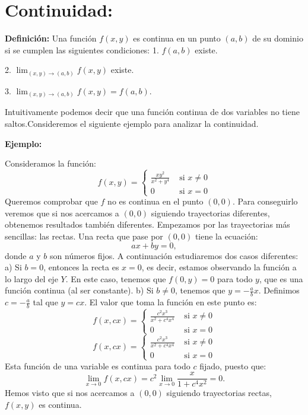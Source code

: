 \section{Continuidad:}
\textbf{Definición:} Una función $f(x, y)$ es continua en un punto $(a, b)$ de su dominio si se cumplen las siguientes condiciones:
1. $f(a, b)$ existe.\par
2. $\lim _{(x, y) \rightarrow(a, b)} f(x, y)$ existe.\par
3. $\lim _{(x, y) \rightarrow(a, b)} f(x, y)=f(a, b)$.\par
\par
Intuitivamente podemos decir que una función continua de dos variables no tiene saltos.Consideremos el siguiente ejemplo para analizar la continuidad.\par
\textbf{Ejemplo:}\par
Consideramos la función:
$$
    f(x, y)= \begin{cases}\frac{x y^{2}}{x^{2}+y^{4}} & \text { si } x \neq 0 \\ 0 & \text { si } x=0\end{cases}
$$
Queremos comprobar que $f$ no es continua en el punto $(0,0)$. Para conseguirlo veremos que si nos acercamos a $(0,0)$ siguiendo trayectorias diferentes, obtenemos resultados también diferentes. Empezamos por las trayectorias más sencillas: las rectas. Una recta que pase por $(0,0)$ tiene la ecuación:
$$
    a x+b y=0,
$$
donde $a$ y $b$ son números fijos. A continuación estudiaremos dos casos diferentes:
a) Si $b=0$, entonces la recta es $x=0$, es decir, estamos observando la función a lo largo del eje $Y$. En este caso, tenemos que $f(0, y)=0$ para todo $y$, que es una función continua (al ser constante).
b) Si $b \neq 0$, tenemos que $y=-\frac{a}{b} x$. Definimos $c=-\frac{a}{b}$ tal que $y=c x$. El valor que toma la función en este punto es:
$$
    f(x, c x)= \begin{cases}\frac{c^{2} x^{3}}{x^{2}+c^{4} x^{4}} & \text { si } x \neq 0 \\ 0 & \text { si } x=0\end{cases}
$$
$$
    f(x, c x)= \begin{cases}\frac{c^{2} x^{3}}{x^{2}+c^{4} x^{4}} & \text { si } x \neq 0 \\ 0 & \text { si } x=0\end{cases}
$$
Esta función de una variable es continua para todo $c$ fijado, puesto que:
$$
    \lim _{x \rightarrow 0} f(x, c x)=c^{2} \lim _{x \rightarrow 0} \frac{x}{1+c^{4} x^{2}}=0 .
$$
Hemos visto que si nos acercamos a $(0,0)$ siguiendo trayectorias rectas, $f(x, y)$ es continua.
